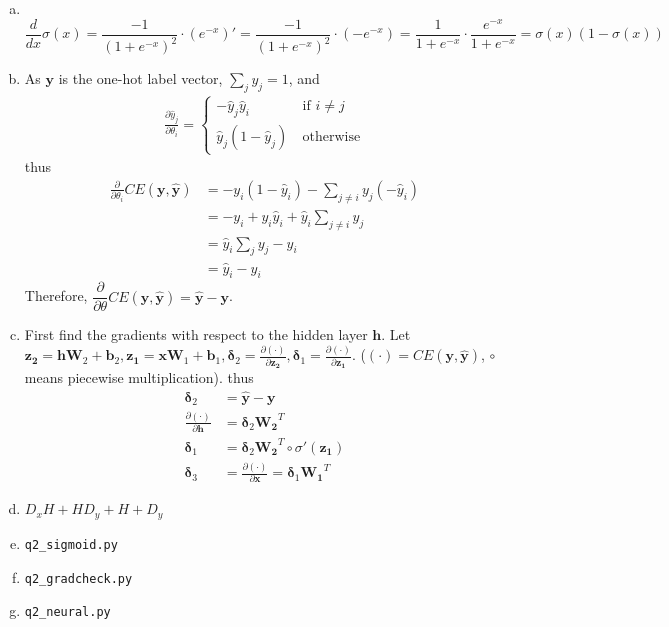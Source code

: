 \documentclass[11pt]{article}
\newcommand{\pder}[2][]{\frac{\partial#1}{\partial#2}}
\newcommand{\omitJ}{(\bm{\cdot})}
\newcommand{\pderJ}[1]{\pder[\omitJ]{#1}}
\begin{document}
\begin{enumerate}[(a)]
\item \
  \[
    \frac{d}{dx}\sigma(x) = \frac{-1}{(1 + e^{-x})^2}\cdot (e^{-x})' =
    \frac{-1}{(1 + e^{-x})^2}\cdot ( - e^{-x}) = \frac{1}{1 + e^{-x}} \cdot
    \frac{e^{-x}}{1 + e^{-x}} = \sigma(x)(1 - \sigma(x))
  \]
\item As $\bm{y}$ is the one-hot label vector, $\sum_jy_j = 1$, 
  and
  \begin{align*}
    \frac{\partial \hat{y}_j}{\partial \theta_i} =
    \begin{cases}
      -\hat{y}_j\hat{y}_i  &\ \mbox{if } i \neq j \\
      \hat{y}_j(1 - \hat{y}_j) &\ \mbox{otherwise} 
    \end{cases}
  \end{align*}
  thus
  \begin{align*}
    \frac{\partial }{\partial\theta_i}CE(\bm{y}, \hat{\bm{y}}) &= - y_i(1 - \hat{y}_i) - \sum_{j \neq i} y_j (- \hat{y}_i) \\
                                                               &= -y_i + y_i\hat{y}_i + \hat{y}_i\sum_{j \neq i} y_j \\
                                                               &= \hat{y}_i\sum_{j} y_j - y_i \\
    &= \hat{y}_i - y_i
  \end{align*}
  Therefore, $\dfrac{\partial}{\partial \theta}CE(\bm{y}, \hat{\bm{y}}) = \hat{\bm{y}}
  - \bm{y}$.
\item First find the gradients with respect to the hidden layer $\bm{h}$. Let
  $\bm{z_2} = \bm{hW}_2 + \bm{b}_2, \bm{z_1} = \bm{xW}_1 + \bm{b}_1,
  \bm{\delta}_2 = \pderJ{\bm{z_2}}, \bm{\delta}_1 = \pderJ{\bm{z_1}}$. ($(\cdot)
  = CE(\bm{y}, \hat{\bm{y}})$, $\circ$ means piecewise multiplication).
  thus
  \begin{align*}
    \bm{\delta}_2 &= \hat{\bm{y}} - \bm{y}  \\
    \pderJ{\bm{h}} &= \bm{\delta}_2\bm{W_2}^T \\
    \bm{\delta}_1 &= \bm{\delta}_2\bm{W_2}^T \circ \sigma'(\bm{z_1}) \\
    \bm{\delta}_3 &= \pderJ{\bm{x}} = \bm{\delta}_1\bm{W_1}^T
  \end{align*}
  
\item $D_xH + HD_y + H + D_y$
  
\item \verb|q2_sigmoid.py|
\item \verb|q2_gradcheck.py|
\item \verb|q2_neural.py|
\end{enumerate}
\end{document}
